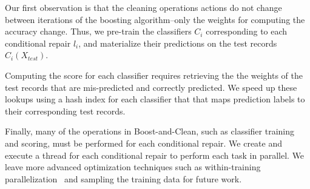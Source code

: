  Our first observation is that the cleaning operations actions do not change between iterations of the boosting algorithm--only the weights for computing the accuracy change.  Thus, we pre-train the classifiers $C_i$ corresponding to each conditional repair $l_i$, and materialize their predictions on the test records $C_i(X_{test})$.  

 Computing the score for each classifier requires retrieving the the weights of the test records that are mis-predicted and correctly predicted.  We speed up these lookups using a hash index for each classifier that that maps prediction labels to their corresponding test records.

  Finally, many of the operations in Boost-and-Clean, such as classifier training and scoring, must be performed for each conditional repair.  We create and execute a thread for each conditional repair to perform each task in parallel.  We leave more advanced optimization techniques such as within-training parallelization~\cite{recht2011hogwild} and sampling the training data for future work.